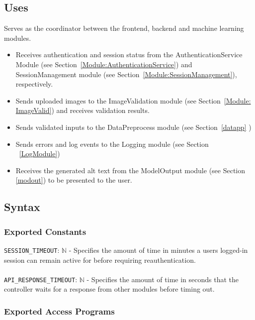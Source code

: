 \documentclass[12pt, titlepage]{article}
\begin{document}
\subsection{Uses}
Serves as the coordinator between the frontend, backend and machine
learning modules.
\begin{itemize}
  \item Receives authentication and session status from the AuthenticationService Module (see Section~\ref{Module:AuthenticationService}) and SessionManagement module (see Section~\ref{Module:SessionManagement}), respectively.
  \item Sends uploaded images to the ImageValidation module (see Section~\ref{Module: ImageValid}) and receives validation results. 
  \item Sends validated inputs to the DataPreprocess module (see Section~\ref{datapp} )
  \item Sends errors and log events to the Logging module (see Section ~\ref{LogModule})
  \item Receives the generated alt text from the ModelOutput module (see Section \ref{modout}) to be presented to the user.
\end{itemize}

\subsection{Syntax}

\subsubsection{Exported Constants}
\texttt{SESSION\_TIMEOUT}: $\mathbb{N}$ - Specifies the amount of
time in minutes a users logged-in session can remain active for
before requiring reauthentication.\\ \\
\texttt{API\_RESPONSE\_TIMEOUT}: $\mathbb{N}$ - Specifies the amount
of time in seconds that the controller waits for a response from
other modules before timing out.\\

\subsubsection{Exported Access Programs}
\end{document}
